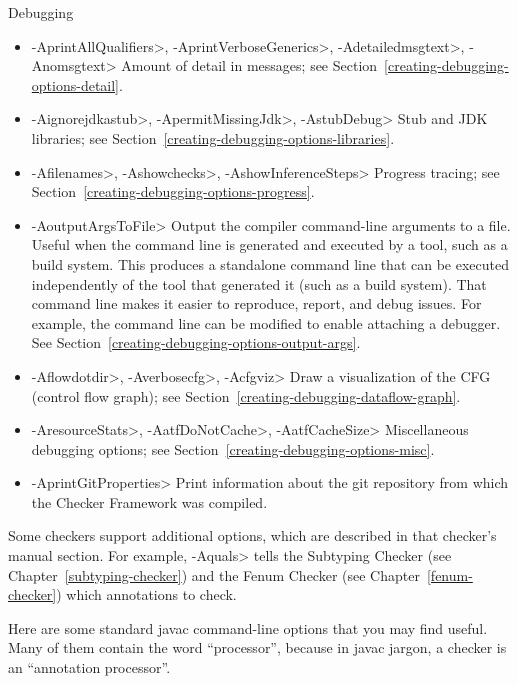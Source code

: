 Debugging
\begin{itemize}
\item
 \<-AprintAllQualifiers>,
 \<-AprintVerboseGenerics>,
 \<-Adetailedmsgtext>,
 \<-Anomsgtext>
Amount of detail in messages; see Section~\ref{creating-debugging-options-detail}.

\item
 \<-Aignorejdkastub>,
 \<-ApermitMissingJdk>,
 \<-AstubDebug>
Stub and JDK libraries; see Section~\ref{creating-debugging-options-libraries}.

\item
 \<-Afilenames>,
 \<-Ashowchecks>,
 \<-AshowInferenceSteps>
Progress tracing; see Section~\ref{creating-debugging-options-progress}.

\item
\<-AoutputArgsToFile>
Output the compiler command-line arguments to a file.  Useful when the
command line is generated and executed by a tool, such as a build system.
This produces a standalone command line that can be executed independently
of the tool that generated it (such as a build system).
That command line makes it easier to reproduce, report, and debug issues.
For example, the command line can be modified to enable attaching a debugger.
See Section~\ref{creating-debugging-options-output-args}.

\item
 \<-Aflowdotdir>,
 \<-Averbosecfg>,
 \<-Acfgviz>
 Draw a visualization of the CFG (control flow graph); see
 Section~\ref{creating-debugging-dataflow-graph}.

\item
 \<-AresourceStats>,
 \<-AatfDoNotCache>,
 \<-AatfCacheSize>
Miscellaneous debugging options; see Section~\ref{creating-debugging-options-misc}.

\item
 \<-AprintGitProperties>
Print information about the git repository from which the Checker Framework
was compiled.

\end{itemize}


\noindent
Some checkers support additional options, which are described in that
checker's manual section.
For example, \<-Aquals> tells
the Subtyping Checker (see Chapter~\ref{subtyping-checker}) and the Fenum Checker
(see Chapter~\ref{fenum-checker}) which annotations to check.


Here are some standard javac command-line options that you may find useful.
Many of them contain the word ``processor'', because in javac jargon, a
checker is an ``annotation processor''.

